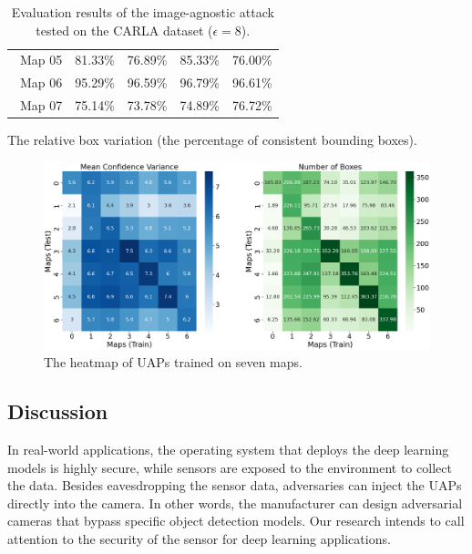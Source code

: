 \begin{table}[H]
\begin{subtable}[t]{\textwidth}
\begin{tabular}{lccca}
        \ Map 05 & 81.33\% & 76.89\% & 85.33\% & 76.00\% \\
        \ Map 06 & 95.29\% & 96.59\% & 96.79\% & 96.61\% \\
        \ Map 07 & 75.14\% & 73.78\% & 74.89\% & 76.72\% \\
        \hline
        \end{tabular}
        \caption{The relative box variation (the percentage of consistent bounding boxes).}
        \label{tab:trans_rela_box}
    \end{subtable}
\hspace{\fill}
    \caption{Evaluation results of the image-agnostic attack tested on the CARLA dataset ($\epsilon=8$).}
    \label{tab:trans}
\end{table}

\clearpage

\begin{figure}[H]
    \centering
    \includegraphics[width=\linewidth]{figures/chapter_detection/hardware/cor.png}
  \caption{The heatmap of UAPs trained on seven maps.}
  \label{fig:cor}
\end{figure}

\subsection{Discussion}

In real-world applications, the operating system that deploys the deep learning models is highly secure, while sensors are exposed to the environment to collect the data. Besides eavesdropping the sensor data, adversaries can inject the UAPs directly into the camera. In other words, the manufacturer can design adversarial cameras that bypass specific object detection models. Our research intends to call attention to the security of the sensor for deep learning applications. 




